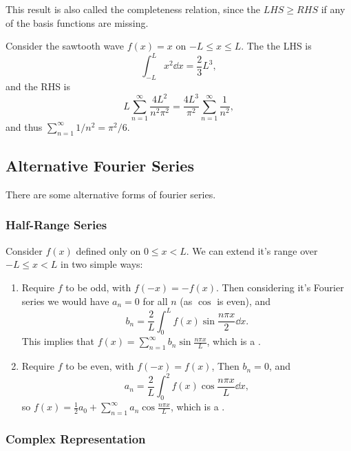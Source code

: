 \documentclass[a4paper]{scrartcl}
\begin{document}
This result is also called the completeness relation, since the $LHS \geq RHS$ if any of the basis functions are missing.

\begin{example}
    Consider the sawtooth wave $f(x) = x$ on $-L \leq x \leq L$. The the LHS is
    $$
    \int_{-L}^{L} x^2 \dd x = \frac{2}{3}L^3,
    $$
    and the RHS is
    $$
    L \sum_{n = 1}^{\infty} \frac{4L^2}{n^2 \pi^2} = \frac{4L^3}{\pi^2}\sum_{n = 1}^{\infty} \frac{1}{n^2},
    $$
    and thus $\sum_{n = 1}^{\infty} 1/n^2 = \pi^2/6$.
\end{example}


\subsection{Alternative Fourier Series}

There are some alternative forms of fourier series.

\subsubsection*{Half-Range Series}

Consider $f(x)$ defined only on $0 \leq x < L$. We can extend it's range over $-L \leq x < L$ in two simple ways:
\begin{enumerate}
    \item Require $f$ to be odd, with $f(-x) = -f(x)$. Then considering it's Fourier series we would have $a_n = 0$ for all $n$ (as $\cos$ is even), and
    $$
    b_{n}=\frac{2}{L} \int_{0}^{L} f(x) \sin \frac{n \pi x}{2} \dd x.
    $$
    This implies that $f(x) = \sum_{n= 1}^{\infty} b_n \sin \frac{n \pi x}{L}$, which is a .
    \item Require $f$ to be even, with $f(-x) = f(x)$, Then $b_n = 0$, and
    $$
    a_{n}=\frac{2}{L} \int_{0}^{2} f(x) \cos \frac{n \pi x}{L} \dd x,
    $$
    so $f(x) = \frac{1}{2}a_0 + \sum_{n = 1}^{\infty} a_n \cos\frac{n \pi x}{L}$, which is a .
\end{enumerate}

\subsubsection*{Complex Representation}
\end{document}
